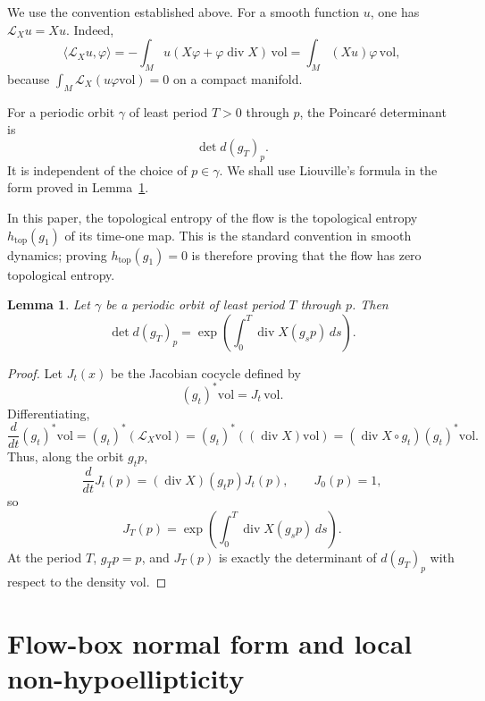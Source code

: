 \documentclass[12pt]{article}
\newtheorem{lemma}[theorem]{Lemma}
\theoremstyle{definition}
\newcommand{\vol}{\mathrm{vol}}
\DeclareMathOperator{\Div}{div}
\begin{document}
We use the convention established above.  For a smooth function \(u\), one has \(\mathcal L_X u=Xu\).  Indeed,
\[
\langle \mathcal L_X u,\varphi\rangle
=
-\int_M u(X\varphi+\varphi\Div X)\,\vol
=
\int_M (Xu)\varphi\,\vol,
\]
because \(\int_M \mathcal L_X(u\varphi\vol)=0\) on a compact manifold.

For a periodic orbit \(\gamma\) of least period \(T>0\) through \(p\), the Poincar\'e determinant is
\[
\det d(g_T)_p .
\]
It is independent of the choice of \(p\in\gamma\).  We shall use Liouville's formula in the form proved in Lemma~\ref{lem:liouville}.

In this paper, the topological entropy of the flow is the topological entropy \(h_{\mathrm{top}}(g_1)\) of its time-one map.  This is the standard convention in smooth dynamics; proving \(h_{\mathrm{top}}(g_1)=0\) is therefore proving that the flow has zero topological entropy.

\begin{lemma}\label{lem:liouville}
Let \(\gamma\) be a periodic orbit of least period \(T\) through \(p\).  Then
\[
\det d(g_T)_p
=
\exp\left(\int_0^T \Div X(g_s p)\,ds\right).
\]
\end{lemma}

\begin{proof}
Let \(J_t(x)\) be the Jacobian cocycle defined by
\[
(g_t)^*\vol=J_t\,\vol .
\]
Differentiating,
\[
\frac{d}{dt}(g_t)^*\vol
=
(g_t)^*(\mathcal L_X\vol)
=
(g_t)^*((\Div X)\vol)
=
(\Div X\circ g_t)(g_t)^*\vol .
\]
Thus, along the orbit \(g_t p\),
\[
\frac{d}{dt}J_t(p)=(\Div X)(g_t p)J_t(p),
\qquad J_0(p)=1,
\]
so
\[
J_T(p)=\exp\left(\int_0^T \Div X(g_s p)\,ds\right).
\]
At the period \(T\), \(g_Tp=p\), and \(J_T(p)\) is exactly the determinant of \(d(g_T)_p\) with respect to the density \(\vol\).
\end{proof}

\section{Flow-box normal form and local non-hypoellipticity}
\label{sec:flowbox}
\end{document}
